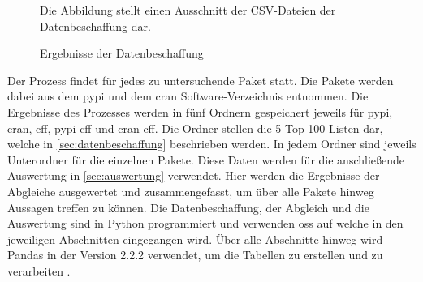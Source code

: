 \begin{figure}
    \centering
    \caption{Ergebnisse der Datenbeschaffung}
    \label{fig:datenbeschaffung_ergebnisse}
    \small
    Die Abbildung stellt einen Ausschnitt der CSV-Dateien der Datenbeschaffung dar.
\end{figure}

Der Prozess findet für jedes zu untersuchende Paket statt.
Die Pakete werden dabei aus dem \gls{pypi} und dem \gls{cran} Software-Verzeichnis entnommen.
Die Ergebnisse des Prozesses werden in fünf Ordnern gespeichert jeweils für \gls{pypi}, \gls{cran}, \gls{cff}, \gls{pypi} \gls{cff} und \gls{cran} \gls{cff}.
Die Ordner stellen die 5 Top 100 Listen dar, welche in \autoref{sec:datenbeschaffung} beschrieben werden.
In jedem Ordner sind jeweils Unterordner für die einzelnen Pakete.
Diese Daten werden für die anschließende Auswertung in \autoref{sec:auswertung} verwendet.
Hier werden die Ergebnisse der Abgleiche ausgewertet und zusammengefasst, um über alle Pakete hinweg Aussagen treffen zu können.
Die Datenbeschaffung, der Abgleich und die Auswertung sind in Python programmiert und verwenden \gls{oss} auf welche in den jeweiligen Abschnitten eingegangen wird.
Über alle Abschnitte hinweg wird Pandas in der Version 2.2.2 verwendet, um die Tabellen zu erstellen und zu verarbeiten \autocite{the_pandas_development_team_pandas-devpandas_2024}.




